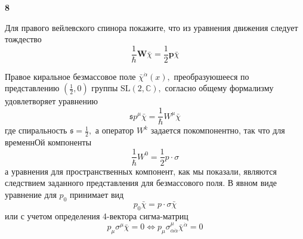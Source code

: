 \documentclass[a4paper,12pt]{article} %
\begin{document}
\begin{ttask}\textbf{8}


Для правого вейлевского спинора покажите, что из уравнения движения следует тождество
$$
\frac{1}{\hbar} \boldsymbol{W} \bar{\chi}=\frac{1}{2} \boldsymbol{p} \bar{\chi}
$$


Правое киральное безмассовое поле $\bar{\chi}^{\dot{\alpha}}(x),$ преобразуюшееся по представлению $\left(\frac{1}{2}, 0\right)$ группы $\mathrm{SL}(2, \mathbb{C}),$ согласно общему формализму удовлетворяет уравнению
$$
\mathfrak{s} p^{\mu} \bar{\chi}=\frac{1}{\hbar} W^{\mu} \bar{\chi}
$$
где спиральность $\mathfrak{s}=\frac{1}{2},$ а оператор $W^{k}$ задается покомпонентно, так что для временнОй компоненты
$$
\frac{1}{\hbar} W^{0}=\frac{1}{2} p \cdot \sigma
$$
а уравнения для пространственных компонент, как мы показали, являются следствием заданного представления для безмассового поля. В явном виде уравнение для $p_{0}$ принимает вид
$$
p_{0} \bar{\chi}=p \cdot \sigma \bar{\chi}
$$
или с учетом определения 4-вектора сигма-матриц
$$
p_{\mu} \sigma^{\mu} \bar{\chi}=0 \Leftrightarrow p_{\mu} \sigma_{\alpha \dot{\alpha}}^{\mu} \bar{\chi}^{\dot{\alpha}}=0
$$

















\end{ttask}
\end{document}
